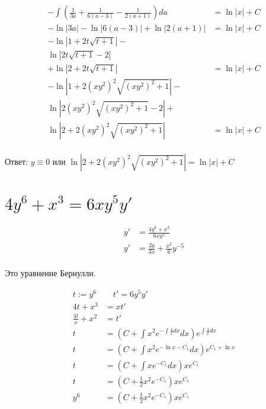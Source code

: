 \begin{align*}
    -\int \left(\frac{1}{3a}+\frac{1}{6(a-3)}-\frac{1}{2(a+1)}\right)da & = \ln |x| + C \\
    -\ln |3a| - \ln |6(a-3)| + \ln |2(a+1)|                             & = \ln |x| + C \\
    -\ln |1+2t\sqrt{t+1}| -                                                             \\
    \ln |2t\sqrt{t+1}-2|                                                                \\
    + \ln |2+2t\sqrt{t+1}|                                              & = \ln |x| + C \\
    -\ln |1+2(xy^2)^2\sqrt{(xy^2)^2+1}| -                                               \\
    \ln |2(xy^2)^2\sqrt{(xy^2)^2+1}-2| +                                                \\
    \ln |2+2(xy^2)^2\sqrt{(xy^2)^2+1}|                                  & = \ln |x| + C \\
\end{align*}

Ответ: $y\equiv0$ или $\ln |2+2(xy^2)^2\sqrt{(xy^2)^2+1}| = \ln |x| + C$

\section{$4y^6+x^3=6xy^5y'$}

\begin{align*}
    y' & = \frac{4y^6+x^3}{6xy^5}              \\
    y' & = \frac{2y}{3x} + \frac{x^2}{6}y^{-5} \\
\end{align*}

Это уравнение Бернулли.

\begin{align*}
    t := y^{6}       & \quad t' = 6y^5y'                                                             \\
    4t+x^3           & = xt'                                                                         \\
    \frac{4t}{x}+x^2 & = t'                                                                          \\
    t                & = \left(C + \int x^2 e^{-\int \frac{4}{x}dx}dx \right) e^{\int \frac{4}{x}dx} \\
    t                & = \left(C + \int x^2 e^{-\ln x-C_1}dx \right) e^{C_1 + \ln x}                 \\
    t                & = \left(C + \int x e^{-C_1}dx \right) xe^{C_1}                                \\
    t                & = \left(C + \frac{1}{2}x^2 e^{-C_1} \right) xe^{C_1}                          \\
    y^6              & = \left(C + \frac{1}{2}x^2 e^{-C_1} \right) xe^{C_1}                          \\
\end{align*}

